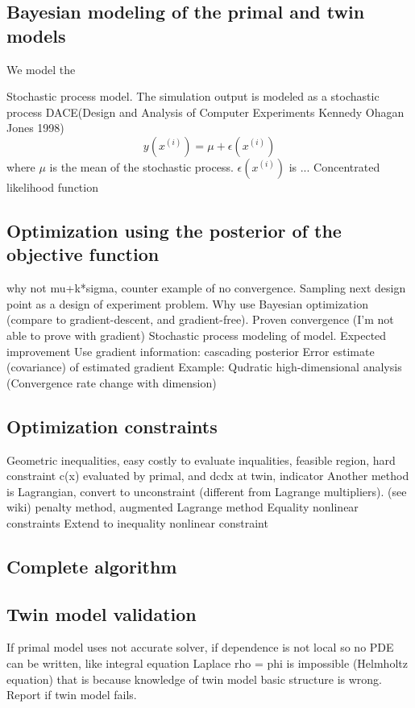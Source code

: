 \documentclass[a4paper,onecolumn]{article}
\theoremstyle{remark}
\begin{document}
\subsection{Bayesian modeling of the primal and twin models}
\label{bayesian_model}
We model the 

Stochastic process model. The simulation output is modeled as a stochastic process
DACE(Design and Analysis of Computer Experiments Kennedy Ohagan Jones 1998)
$$
y(x^{(i)}) = \mu + \epsilon(x^{(i)})
$$
where $\mu$ is the mean of the stochastic process. $\epsilon(x^{(i)})$ is ...
Concentrated likelihood function



\subsection{Optimization using the posterior of the objective function}
\label{bayesian_opt}
why not mu+k*sigma, counter example of no convergence.
Sampling next design point as a design of experiment problem.
Why use Bayesian optimization (compare to gradient-descent, and gradient-free). Proven convergence
(I'm not able to prove with gradient)
Stochastic process modeling of model.
Expected improvement
Use gradient information: cascading posterior
Error estimate (covariance) of estimated gradient
Example:
Qudratic high-dimensional analysis (Convergence rate change with dimension)
\subsection{Optimization constraints}
\label{constraints}
Geometric inequalities, easy
costly to evaluate inqualities, feasible region, hard
constraint c(x) evaluated by primal, and dcdx at twin, indicator
\cite{constraint Bayesian Opt}
Another method is Lagrangian, convert to unconstraint (different from Lagrange multipliers). 
(see wiki)
penalty method, augmented Lagrange method
Equality nonlinear constraints 
\cite{equality nonlinear constraint trust region opt}
Extend to inequality nonlinear constraint \cite{coarse discretization}

\subsection{Complete algorithm}
\label{complete algo}

\subsection{Twin model validation}
If primal model uses not accurate solver, if dependence is not local so no PDE can be written,
like integral equation
Laplace rho = phi is impossible (Helmholtz equation)
that is because knowledge of twin model basic structure is wrong.
Report if twin model fails.
\end{document}
